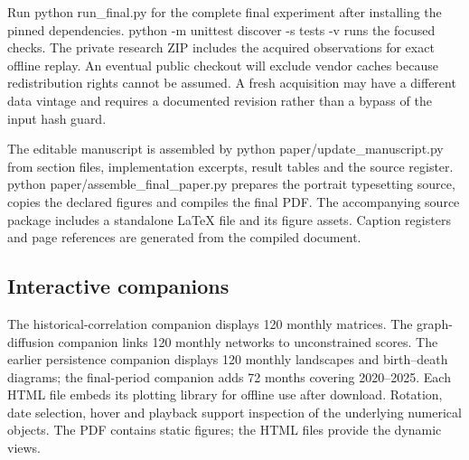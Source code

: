 \documentclass[12pt,a4paper,oneside]{article}
\begin{document}
Run {\ttfamily\fontsize{11.5}{13}\selectfont python run\_final.py} for the complete final experiment after installing the pinned dependencies. {\ttfamily\fontsize{11.5}{13}\selectfont python -m unittest discover -s tests -v} runs the focused checks. The private research ZIP includes the acquired observations for exact offline replay. An eventual public checkout will exclude vendor caches because redistribution rights cannot be assumed. A fresh acquisition may have a different data vintage and requires a documented revision rather than a bypass of the input hash guard.


The editable manuscript is assembled by {\ttfamily\fontsize{11.5}{13}\selectfont python paper/update\_manuscript.py} from section files, implementation excerpts, result tables and the source register. {\ttfamily\fontsize{11.5}{13}\selectfont python paper/assemble\_final\_paper.py} prepares the portrait typesetting source, copies the declared figures and compiles the final PDF. The accompanying source package includes a standalone LaTeX file and its figure assets. Caption registers and page references are generated from the compiled document.


\subsection{Interactive companions}

The historical-correlation companion displays 120 monthly matrices. The graph-diffusion companion links 120 monthly networks to unconstrained scores. The earlier persistence companion displays 120 monthly landscapes and birth–death diagrams; the final-period companion adds 72 months covering 2020–2025. Each HTML file embeds its plotting library for offline use after download. Rotation, date selection, hover and playback support inspection of the underlying numerical objects. The PDF contains static figures; the HTML files provide the dynamic views.
\end{document}
